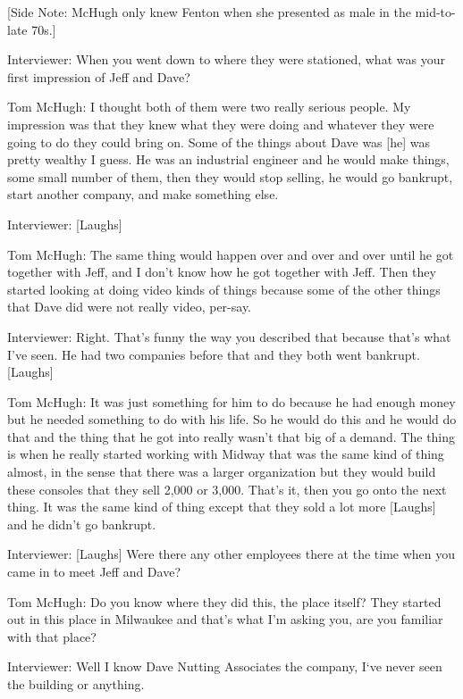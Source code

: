 [Side Note: McHugh only knew Fenton when she presented as male in the mid-to-late 70s.]

\textcolor{interviewer}{Interviewer:} When you went down to where they were stationed, what was your first impression of Jeff and Dave?

\textcolor{interviewee}{Tom McHugh:} I thought both of them were two really serious people. My impression was that they knew what they were doing and whatever they were going to do they could bring on. Some of the things about Dave was [he] was pretty wealthy I guess. He was an industrial engineer and he would make things, some small number of them, then they would stop selling, he would go bankrupt, start another company, and make something else.

\textcolor{interviewer}{Interviewer:} [Laughs]

\textcolor{interviewee}{Tom McHugh:} The same thing would happen over and over and over until he got together with Jeff, and I don’t know how he got together with Jeff. Then they started looking at doing video kinds of things because some of the other things that Dave did were not really video, per-say.

\textcolor{interviewer}{Interviewer:} Right. That’s funny the way you described that because that’s what I’ve seen. He had two companies before that and they both went bankrupt. [Laughs]

\textcolor{interviewee}{Tom McHugh:} It was just something for him to do because he had enough money but he needed something to do with his life. So he would do this and he would do that and the thing that he got into really wasn’t that big of a demand. The thing is when he really started working with Midway that was the same kind of thing almost, in the sense that there was a larger organization but they would build these consoles that they sell 2,000 or 3,000. That’s it, then you go onto the next thing. It was the same kind of thing except that they sold a lot more [Laughs] and he didn’t go bankrupt.

\textcolor{interviewer}{Interviewer:} [Laughs] Were there any other employees there at the time when you came in to meet Jeff and Dave?

\textcolor{interviewee}{Tom McHugh:} Do you know where they did this, the place itself? They started out in this place in Milwaukee and that’s what I’m asking you, are you familiar with that place?

\textcolor{interviewer}{Interviewer:} Well I know Dave Nutting Associates the company, I‘ve never seen the building or anything.

